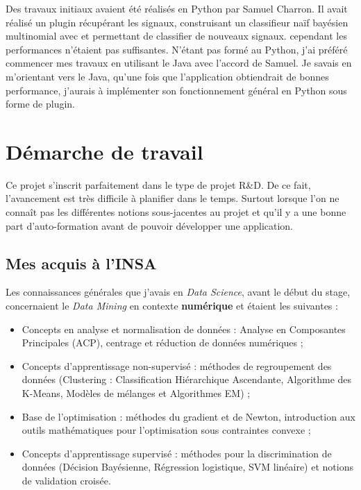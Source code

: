 Des travaux initiaux avaient été réalisés en Python par Samuel Charron. Il avait réalisé un plugin récupérant les signaux, construisant un classifieur naïf bayésien multinomial avec et permettant de classifier de nouveaux signaux. cependant les performances n'étaient pas suffisantes. N'étant pas formé au Python, j'ai préféré commencer mes travaux en utilisant le Java avec l'accord de Samuel. Je savais en m'orientant vers le Java, qu'une fois que l'application obtiendrait de bonnes performance, j'aurais à implémenter son fonctionnement général en Python sous forme de plugin.

\section{Démarche de travail}
    Ce projet s'inscrit parfaitement dans le type de projet R\&D. De ce fait, l'avancement est très difficile à planifier dans le temps. Surtout lorsque l'on ne connaît pas les différentes notions sous-jacentes au projet et qu'il y a une bonne part d'auto-formation avant de pouvoir développer une application.

    \subsection{Mes acquis à l'INSA}
        Les connaissances générales que j'avais en \textit{Data Science}, avant le début du stage, concernaient le \textit{Data Mining} en contexte \textbf{numérique} et étaient les suivantes :
        \begin{itemize}
            \item Concepts en analyse et normalisation de données : Analyse en Composantes Principales (ACP), centrage et réduction de données numériques ;
            \item Concepts d'apprentissage non-supervisé : méthodes de regroupement des données (Clustering : Classification Hiérarchique Ascendante, Algorithme des K-Means, Modèles de mélanges et Algorithmes EM) ;
            \item Base de l'optimisation : méthodes du gradient et de Newton, introduction aux outils mathématiques pour l'optimisation sous contraintes convexe ;
            \item Concepts d'apprentissage supervisé : méthodes pour la discrimination de données (Décision Bayésienne, Régression logistique, SVM linéaire) et notions de validation croisée.\\
        \end{itemize}

